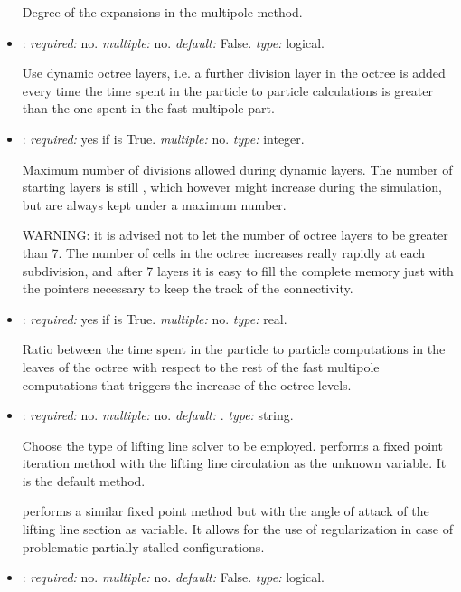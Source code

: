 \begin{itemize}
Degree of the expansions in the multipole method. 

\item {}: \textit{required:} no. \textit{multiple:} no. \textit{default:} False. \textit{type:} logical.

Use dynamic octree layers, i.e. a further division layer in the octree is added every time the time spent in the particle to particle calculations is greater than the one spent in the fast multipole part.

\item {}: \textit{required:} yes if  is True. \textit{multiple:} no. \textit{type:} integer.

Maximum number of divisions allowed during dynamic layers. The number of starting layers is still , which however might increase during the simulation, but are always kept under a maximum number. 

WARNING: it is advised not to let the number of octree layers to be greater than 7. The number of cells in the octree increases really rapidly at each subdivision, and after 7 layers it is easy to fill the complete memory just with the pointers necessary to keep the track of the connectivity. 

\item {}: \textit{required:} yes if  is True. \textit{multiple:} no. \textit{type:} real.

Ratio between the time spent in the particle to particle computations in the leaves of the octree with respect to the rest of the fast multipole computations that triggers the increase of the octree levels.

\item {}: \textit{required:} no. \textit{multiple:} no. \textit{default:} . \textit{type:} string.

Choose the type of lifting line solver to be employed. 
 performs a fixed point iteration method with the lifting line circulation as the unknown variable. It is the default method. 

 performs a similar fixed point method but with the angle of attack of the lifting line section as variable. It allows for the use of regularization in case of problematic partially stalled configurations. 

\item {}: \textit{required:} no. \textit{multiple:} no. \textit{default:} False. \textit{type:} logical.


\end{itemize}
